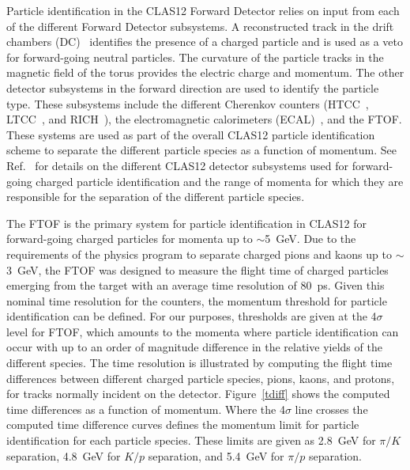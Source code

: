 \documentclass[3p,times,twocolumn]{elsarticle}
\begin{document}
Particle identification in the CLAS12 Forward Detector relies on input from each of the different Forward
Detector subsystems. A reconstructed track in the drift chambers (DC)~\cite{dc-nim} identifies the
presence of a charged particle and is used as a veto for forward-going neutral particles. The curvature
of the particle tracks in the magnetic field of the torus provides the electric charge and momentum.
The other detector subsystems in the forward direction are used to identify the particle type. These
subsystems include the different Cherenkov counters (HTCC~\cite{htcc-nim}, LTCC~\cite{ltcc-nim}, and
RICH~\cite{rich-nim}), the electromagnetic calorimeters (ECAL)~\cite{ec-nim}, and the FTOF. These
systems are used as part of the overall CLAS12 particle identification scheme to separate the different
particle species as a function of momentum. See Ref.~\cite{clas12-nim} for details on the different
CLAS12 detector subsystems used for forward-going charged particle identification and the range of
momenta for which they are responsible for the separation of the different particle species.

The FTOF is the primary system for particle identification in CLAS12 for forward-going charged particles
for momenta up to $\sim$5~GeV. Due to the requirements of the physics program to separate charged pions
and kaons up to $\sim$3~GeV, the FTOF  was designed to measure the flight time of charged particles
emerging from the target with an average time resolution of 80~ps. Given this nominal time resolution for the
counters, the momentum threshold for particle identification can be defined. For our purposes, thresholds are
given at the 4$\sigma$ level for FTOF, which amounts to the momenta where particle identification can occur
with up to an order of magnitude difference in the relative yields of the different species. The time resolution
is illustrated by computing the flight time differences between different charged particle species, pions,
kaons, and protons, for tracks normally incident on the detector. Figure~\ref{tdiff} shows the computed time
differences as a function of momentum. Where the 4$\sigma$ line crosses the computed time difference
curves defines the momentum limit for particle identification for each particle species. These limits are given
as 2.8~GeV for $\pi/K$ separation, 4.8~GeV for $K/p$ separation, and 5.4~GeV for $\pi/p$ separation.  
\end{document}
